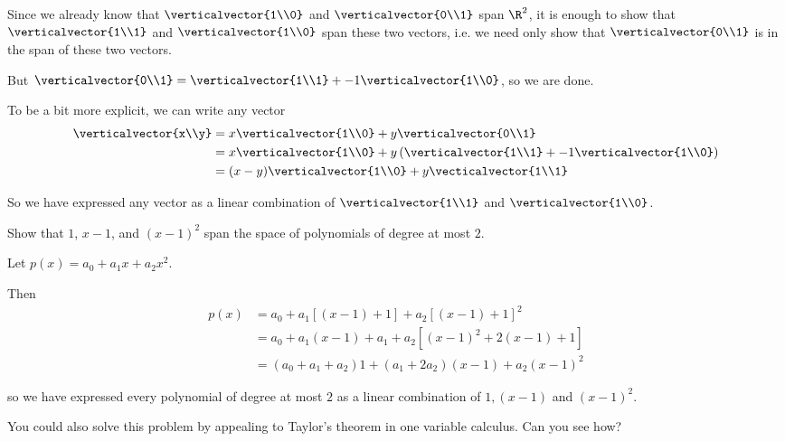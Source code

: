 \documentclass{ximera}
\begin{document}
\begin{free-response}
	Since we already know that $\verticalvector{1\\0}$ and $\verticalvector{0\\1}$ span $\R^2$,
	 it is enough to show that $\verticalvector{1\\1}$ and $\verticalvector{1\\0}$ span these two vectors, i.e.
	 we need only show that $\verticalvector{0\\1}$ is in the span of these two vectors.
	 
	 But $\verticalvector{0\\1} = \verticalvector{1\\1} +-1\verticalvector{1\\0}$, so we are done.
	 
	 To be a bit more explicit, we can write any vector \begin{align*}
	 \verticalvector{x\\y} &= x\verticalvector{1\\0}+ y\verticalvector{0\\1}\\
	 &= x\verticalvector{1\\0}+ y\left(\verticalvector{1\\1} +-1\verticalvector{1\\0}\right)\\
	 &=(x-y)\verticalvector{1\\0}+y\vecticalvector{1\\1}
	 \end{align*}
	 
	 So we have expressed any vector as a linear combination of $\verticalvector{1\\1}$ and $\verticalvector{1\\0}$.
\end{free-response} 

 
 	Show that $1$, $x-1$, and $(x-1)^2$  span the space of polynomials of degree at most $2$.

\begin{free-response}
	Let $p(x)=a_0+a_1x+a_2x^2$. 
	
	Then \begin{align*}
		p(x) &= a_0+a_1[(x-1)+1]+a_2[(x-1)+1]^2\\
			   &= a_0+a_1(x-1)+a_1+a_2[(x-1)^2+2(x-1)+1]\\
			   &= (a_0+a_1+a_2)1+(a_1+2a_2)(x-1)+a_2(x-1)^2
		\end{align*}
	
	so we have expressed every polynomial of degree at most $2$ as a linear combination of $1,(x-1)$ and $(x-1)^2$.
	
	You could also solve this problem by appealing to Taylor's theorem in one variable calculus.  Can you see how?
\end{free-response}

 
\end{document}
